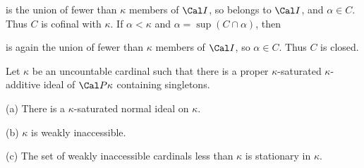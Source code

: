 {\noindent is the union of fewer than $\kappa$ members of $\Cal I$, so
belongs to $\Cal I$, and $\alpha\in C$.   Thus $C$ is cofinal with
$\kappa$.   If $\alpha<\kappa$ and $\alpha=\sup(C\cap\alpha)$, then


\noindent is again the union of fewer than $\kappa$ members of $\Cal I$,
so $\alpha\in C$.   Thus $C$ is closed.
}%

 Let $\kappa$ be an uncountable cardinal
such that there is a proper $\kappa$-saturated $\kappa$-additive ideal of
$\Cal P\kappa$ containing singletons.

(a) There is a $\kappa$-saturated normal ideal on $\kappa$.

(b) $\kappa$ is weakly inaccessible.

(c) The set of weakly inaccessible cardinals less than $\kappa$ is
stationary in $\kappa$.

